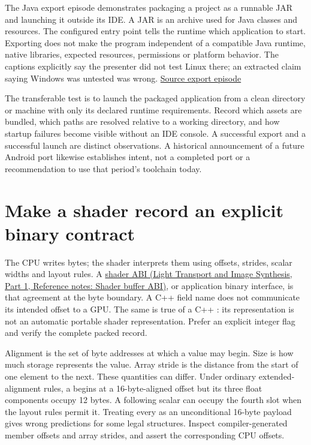 \hypertarget{01-foundations-i-ch008-packaging-removes-an-editor-dependency-not-every-runtime-dependency}{}

The Java export episode demonstrates packaging a project as a runnable JAR and launching it outside its IDE. A JAR is an archive used for Java classes and resources. The configured entry point tells the runtime which application to start. Exporting does not make the program independent of a compatible Java runtime, native libraries, expected resources, permissions or platform behavior. The captions explicitly say the presenter did not test Linux there; an extracted claim saying Windows was untested was wrong. \href{https://www.youtube.com/watch?v=velhSXA2CnQ}{Source export episode}

The transferable test is to launch the packaged application from a clean directory or machine with only its declared runtime requirements. Record which assets are bundled, which paths are resolved relative to a working directory, and how startup failures become visible without an IDE console. A successful export and a successful launch are distinct observations. A historical announcement of a future Android port likewise establishes intent, not a completed port or a recommendation to use that period's toolchain today.

\section{Make a shader record an explicit binary contract}\label{01-foundations-i-ch008-make-a-shader-record-an-explicit-binary-contract}

\hypertarget{01-foundations-i-ch008-make-a-shader-record-an-explicit-binary-contract}{}

The CPU writes bytes; the shader interprets them using offsets, strides, scalar widths and layout rules. A \href{../04-Light-Transport-and-Image-Synthesis-P01/main.pdf\#nameddest=appendix-749048795dbb}{shader ABI (Light Transport and Image Synthesis, Part 1, Reference notes: Shader buffer ABI)}, or application binary interface, is that agreement at the byte boundary. A C++ field name does not communicate its intended offset to a GPU. The same is true of a C++ : its representation is not an automatic portable shader representation. Prefer an explicit integer flag and verify the complete packed record.

Alignment is the set of byte addresses at which a value may begin. Size is how much storage represents the value. Array stride is the distance from the start of one element to the next. These quantities can differ. Under ordinary extended-alignment  rules, a  begins at a 16-byte-aligned offset but its three float components occupy 12 bytes. A following scalar can occupy the fourth slot when the layout rules permit it. Treating every  as an unconditional 16-byte payload gives wrong predictions for some legal structures. Inspect compiler-generated member offsets and array strides, and assert the corresponding CPU offsets.

